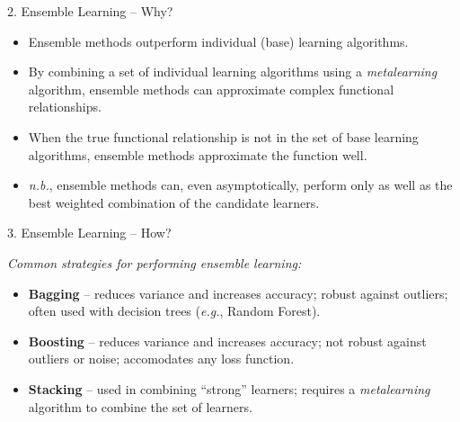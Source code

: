 \documentclass[12pt,t,handout]{beamer}
\begin{document}
\begin{frame}[c]{2. Ensemble Learning -- Why?}

\vspace*{3mm}

\centering

  \begin{itemize}
    \itemsep12pt
    \item Ensemble methods outperform individual (base) learning algorithms.
    \item By combining a set of individual learning algorithms using a
          \textit{metalearning} algorithm, ensemble methods can approximate
          complex functional relationships.
    \item When the true functional relationship is not in the set of base
          learning algorithms, ensemble methods approximate the function well.
    \item \textit{n.b.}, ensemble methods can, even asymptotically, perform only
          as well as the best weighted combination of the candidate learners.
  \end{itemize}
\end{frame}


\begin{frame}[c]{3. Ensemble Learning -- How?}

\vspace*{3mm}

\textit{Common strategies for performing ensemble learning:}

\vspace{1em}

\centering

  \begin{itemize}
    \itemsep12pt
    \item \textbf{Bagging} -- reduces variance and increases accuracy; robust
          against outliers; often used with decision trees (\textit{e.g.},
          Random Forest).
    \item \textbf{Boosting} -- reduces variance and increases accuracy; not
          robust against outliers or noise; accomodates any loss function.
    \item \textbf{Stacking} -- used in combining ``strong'' learners; requires
          a \textit{metalearning} algorithm to combine the set of learners.
  \end{itemize}

\note{
}
\end{frame}
\end{document}

